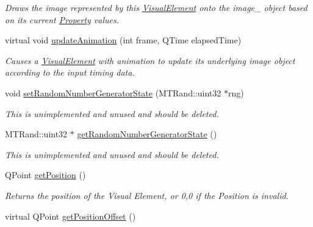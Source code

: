 \begin{DoxyCompactItemize}
\begin{DoxyCompactList}\small\item\em Draws the image represented by this \hyperlink{struct_picto_1_1_visual_element}{Visual\-Element} onto the image\-\_\- object based on its current \hyperlink{class_picto_1_1_property}{Property} values. \end{DoxyCompactList}\item 
virtual void \hyperlink{struct_picto_1_1_visual_element_a598c8f6e33c58b85b80197e3743b0e91}{update\-Animation} (int frame, Q\-Time elapsed\-Time)
\begin{DoxyCompactList}\small\item\em Causes a \hyperlink{struct_picto_1_1_visual_element}{Visual\-Element} with animation to update its underlying image object according to the input timing data. \end{DoxyCompactList}\item 
\hypertarget{struct_picto_1_1_visual_element_a60a3f2889c3caec22f8ddb45173051da}{void \hyperlink{struct_picto_1_1_visual_element_a60a3f2889c3caec22f8ddb45173051da}{set\-Random\-Number\-Generator\-State} (M\-T\-Rand\-::uint32 $\ast$rng)}\label{struct_picto_1_1_visual_element_a60a3f2889c3caec22f8ddb45173051da}

\begin{DoxyCompactList}\small\item\em This is unimplemented and unused and should be deleted. \end{DoxyCompactList}\item 
\hypertarget{struct_picto_1_1_visual_element_a806a104a72f70d191be19c6cc4076359}{M\-T\-Rand\-::uint32 $\ast$ \hyperlink{struct_picto_1_1_visual_element_a806a104a72f70d191be19c6cc4076359}{get\-Random\-Number\-Generator\-State} ()}\label{struct_picto_1_1_visual_element_a806a104a72f70d191be19c6cc4076359}

\begin{DoxyCompactList}\small\item\em This is unimplemented and unused and should be deleted. \end{DoxyCompactList}\item 
\hypertarget{struct_picto_1_1_visual_element_ae3ab50d47e35a607752d530f7108afe4}{Q\-Point \hyperlink{struct_picto_1_1_visual_element_ae3ab50d47e35a607752d530f7108afe4}{get\-Position} ()}\label{struct_picto_1_1_visual_element_ae3ab50d47e35a607752d530f7108afe4}

\begin{DoxyCompactList}\small\item\em Returns the position of the Visual Element, or 0,0 if the Position is invalid. \end{DoxyCompactList}\item 
\hypertarget{struct_picto_1_1_visual_element_ab2cc472e080868dd4504c9df323d0559}{virtual Q\-Point \hyperlink{struct_picto_1_1_visual_element_ab2cc472e080868dd4504c9df323d0559}{get\-Position\-Offset} ()}\label{struct_picto_1_1_visual_element_ab2cc472e080868dd4504c9df323d0559}


\end{DoxyCompactItemize}
